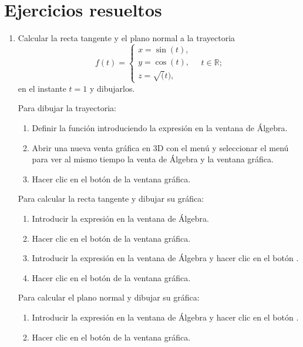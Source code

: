 \newpage

\section{Ejercicios resueltos}
\begin{enumerate}[leftmargin=*]
\item Calcular la recta tangente y el plano normal a la trayectoria
\[
f(t)=
\begin{cases}
x=\sin(t),\\
y=\cos(t),\\
z=\sqrt(t),
\end{cases}
\quad t\in \mathbb{R};
\] 
en el instante $t=1$ y dibujarlos.
  
\begin{indicacion}
Para dibujar la trayectoria:
\begin{enumerate}
\item Definir la función introduciendo la expresión  en la ventana de Álgebra.
\item Abrir una nueva venta gráfica en 3D con el menú  y seleccionar el menú  para ver al mismo tiempo la venta de Álgebra y la ventana gráfica.
\item Hacer clic en el botón  de la ventana gráfica.
\end{enumerate}
Para calcular la recta tangente y dibujar su gráfica:
\begin{enumerate}
\item Introducir la expresión  en la ventana de Álgebra.
\item Hacer clic en el botón  de la ventana gráfica.
\item Introducir la expresión  en la ventana de Álgebra y hacer clic en el botón .
\item Hacer clic en el botón  de la ventana gráfica.
\end{enumerate}
Para calcular el plano normal y dibujar su gráfica:
\begin{enumerate}
\item Introducir la expresión  en la ventana de Álgebra y hacer clic en el botón .
\item Hacer clic en el botón  de la ventana gráfica.
\end{enumerate}
\end{indicacion}    
  

\end{enumerate}
